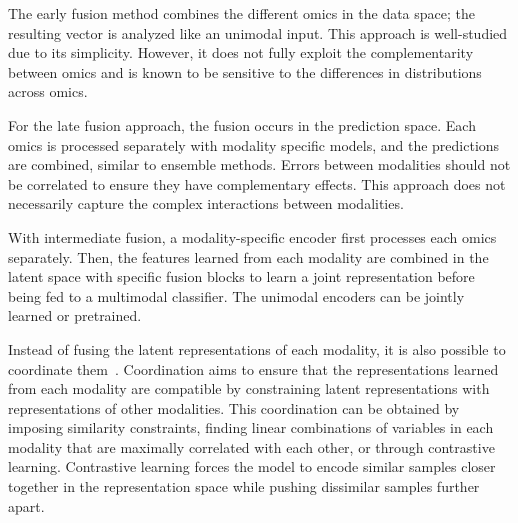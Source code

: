 \documentclass[../main.tex]{subfiles}
\begin{document}
	\begin{description}[%
	        style=multiline,
	        leftmargin=!,
	        labelwidth=2.5cm,
	    ]
	    \item[Early fusion]
		    The early fusion method combines the different omics in the data space; the resulting vector is analyzed like an unimodal input.
		    This approach is well-studied due to its simplicity.
		    However, it does not fully exploit the complementarity between omics and is known to be sensitive to the differences in distributions across omics.
	    \item[Late fusion]
		    For the late fusion approach, the fusion occurs in the prediction space.
		    Each omics is processed separately with modality specific models, and the predictions are combined, similar to ensemble methods.
		    Errors between modalities should not be correlated to ensure they have complementary effects.
		    This approach does not necessarily capture the complex interactions between modalities.
	    \item[Intermediate fusion]
		    With intermediate fusion, a modality-specific encoder first processes each omics separately.
		    Then, the features learned from each modality are combined in the latent space with specific fusion blocks to learn a joint representation before being fed to a multimodal classifier.
		    The unimodal encoders can be jointly learned or pretrained.
	\end{description}
	Instead of fusing the latent representations of each modality, it is also possible to coordinate them~\cite{MML_morency}.
	Coordination aims to ensure that the representations learned from each modality are compatible by constraining latent representations with representations of other modalities.
	This coordination can be obtained by imposing similarity constraints, finding linear combinations of variables in each modality that are maximally correlated with each other, or through contrastive learning.
	Contrastive learning forces the model to encode similar samples closer together in the representation space while pushing dissimilar samples further apart.
\end{document}
